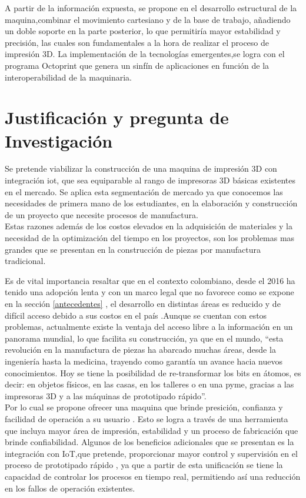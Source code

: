 A partir de la información expuesta, se propone en el desarrollo estructural de la maquina,combinar el movimiento cartesiano y de la base de trabajo, añadiendo un doble soporte en la parte posterior, lo que permitiría mayor estabilidad y precisión, las cuales son fundamentales a la hora de realizar el proceso de impresión 3D. La implementación de la tecnologías emergentes,se logra con el programa Octoprint que genera un sinfín de aplicaciones en función de la interoperabilidad de la maquinaria.\\

\newpage
\section{Justificación y pregunta de Investigación}

Se pretende viabilizar la construcción de una maquina de impresión 3D con integración \acrshort{iot}, que sea equiparable al rango de impresoras 3D básicas existentes en el mercado. Se aplica esta segmentación de mercado ya que conocemos las necesidades de primera mano de los estudiantes, en la elaboración y construcción de un proyecto que necesite procesos de manufactura.\\

 Estas razones además de los costos elevados en la adquisición de materiales y la necesidad de la optimización del tiempo en los proyectos, son los problemas mas grandes que se presentan en la construcción de piezas por manufactura tradicional.

Es de vital importancia resaltar que en el contexto colombiano, desde el 2016 ha tenido una adopción lenta y con un marco legal que no favorece como se expone en la sección \ref{antecedentes} , el desarrollo en distintas áreas es reducido y de difícil acceso debido a sus costos en el país .Aunque se cuentan con estos problemas, actualmente existe la ventaja del acceso libre a la información en un panorama mundial, lo que facilita su construcción, ya que en el mundo, “esta revolución en la manufactura de piezas ha abarcado muchas áreas, desde la ingeniería hasta la medicina, trayendo como garantía un avance hacia nuevos conocimientos. Hoy se tiene la posibilidad de re-transformar los bits en átomos, es decir: en objetos físicos, en las casas, en los talleres o en una \acrshort{pyme}, gracias a las impresoras 3D y a las máquinas de prototipado rápido''\citep{berchon}.\\

  Por lo cual se propone ofrecer una maquina que brinde presición, confianza y facilidad de operación a su usuario . Esto se logra a través de una herramienta que incluya mayor área de impresión, estabilidad y un proceso de fabricación que brinde confiabilidad. Algunos de los beneficios adicionales que se presentan es la integración con IoT,que pretende, proporcionar mayor control y supervisión en el proceso de prototipado rápido , ya que a partir de esta unificación se tiene la capacidad de controlar los procesos en tiempo real, permitiendo así una reducción en los fallos de operación existentes.\\

